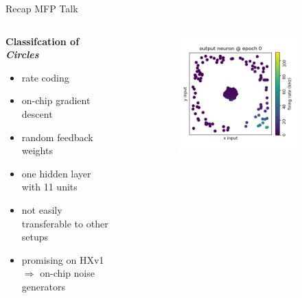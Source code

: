 \documentclass[12pt, aspectratio=169]{beamer}
\begin{document}
\begin{frame}{Recap MFP Talk}
\begin{columns}[t]
	\begin{column}{0.5\textwidth}
		\textbf{Classifcation of \emph{Circles}}
		\begin{itemize}
			\item rate coding
			\item on-chip gradient descent
			\item random feedback weights
			\item one hidden layer with 11 units
			\item not easily transferable to other setups
			\item promising on HXv1\\
			$\Rightarrow$ on-chip noise generators
		\end{itemize}
	\end{column}
	\begin{column}{0.5\textwidth}
		\begin{figure}
			\vspace{-1cm}
			\begin{subfigure}{0.3\textwidth}
				\centering
				\includegraphics[scale=0.20]{mfp/learning_process/output_neuron_5.png}
				\label{cubesetup}
			\end{subfigure}
			\begin{subfigure}{0.3\textwidth}
				\centering

\end{subfigure}
\end{figure}
\end{column}
\end{columns}
\end{frame}
\end{document}
